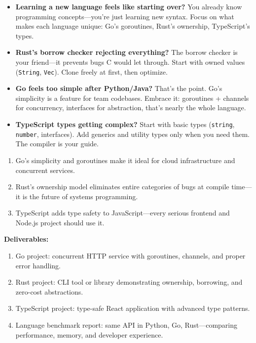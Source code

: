 \documentclass[11pt, a4paper, oneside]{report}
\begin{document}
\begin{stuckbox}
\begin{itemize}[leftmargin=*]
\item \textbf{Learning a new language feels like starting over?} You already know programming concepts---you're just learning new syntax. Focus on what makes each language unique: Go's goroutines, Rust's ownership, TypeScript's types.
\item \textbf{Rust's borrow checker rejecting everything?} The borrow checker is your friend---it prevents bugs C would let through. Start with owned values (\texttt{String}, \texttt{Vec}). Clone freely at first, then optimize.
\item \textbf{Go feels too simple after Python/Java?} That's the point. Go's simplicity is a feature for team codebases. Embrace it: goroutines + channels for concurrency, interfaces for abstraction, that's nearly the whole language.
\item \textbf{TypeScript types getting complex?} Start with basic types (\texttt{string}, \texttt{number}, interfaces). Add generics and utility types only when you need them. The compiler is your guide.
\end{itemize}
\end{stuckbox}


\begin{takeawaybox}
\begin{enumerate}[leftmargin=*]
\item Go's simplicity and goroutines make it ideal for cloud infrastructure and concurrent services.
\item Rust's ownership model eliminates entire categories of bugs at compile time---it is the future of systems programming.
\item TypeScript adds type safety to JavaScript---every serious frontend and Node.js project should use it.
\end{enumerate}
\end{takeawaybox}

\begin{milestonebox}
\textbf{Deliverables:}
\begin{enumerate}[leftmargin=*]
\item Go project: concurrent HTTP service with goroutines, channels, and proper error handling.
\item Rust project: CLI tool or library demonstrating ownership, borrowing, and zero-cost abstractions.
\item TypeScript project: type-safe React application with advanced type patterns.
\item Language benchmark report: same API in Python, Go, Rust---comparing performance, memory, and developer experience.
\end{enumerate}
\end{milestonebox}
\end{document}
